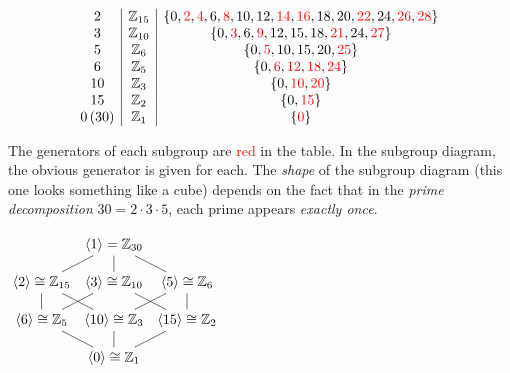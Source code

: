\begin{example}{}{}
\[\begin{array}[t]{c|c|c}
			2 & \mathbb{Z}_{15} & \{0,\textcolor{red}{2},\textcolor{red}{4},6,\textcolor{red}{8},10,12,\textcolor{red}{14},\textcolor{red}{16},18,20,\textcolor{red}{22},24,\textcolor{red}{26},\textcolor{red}{28}\}\\
			3 & \mathbb{Z}_{10} & \{0,\textcolor{red}{3},6,\textcolor{red}{9},12,15,18,\textcolor{red}{21},24,\textcolor{red}{27}\}\\
			5 & \mathbb{Z}_6 & \{0,\textcolor{red}{5},10,15,20,\textcolor{red}{25}\}\\
			6 & \mathbb{Z}_5 & \{0,\textcolor{red}{6},\textcolor{red}{12},\textcolor{red}{18},\textcolor{red}{24}\}\\
			10 & \mathbb{Z}_3 & \{0,\textcolor{red}{10},\textcolor{red}{20}\}\\
			15 & \mathbb{Z}_2 & \{0,\textcolor{red}{15}\}\\
			0\,(30) & \mathbb{Z}_1 & \{\textcolor{red}{0}\}
   \end{array}
  \]
    
	\begin{minipage}[t]{0.62\linewidth}\vspace{0pt}
		The generators of each subgroup are \textcolor{red}{red} in the table. In the subgroup diagram, the obvious generator is given for each.\smallbreak
		The \emph{shape} of the subgroup diagram (this one looks something like a cube) depends on the fact that in the \emph{prime decomposition} $30=2\cdot 3\cdot 5$, each prime appears \emph{exactly once}.
	\end{minipage}
	\hfill
	\begin{minipage}[t]{0.36\linewidth}\vspace{-5pt}
		\flushright%
		$\xymatrix @C4pt @R11pt{%
		 	& \ip{1}=\Z_{30} \ar@{-}[dl] \ar@{-}[d] \ar@{-}[dr] & \\
			\ip{2}\cong \Z_{15} \ar@{-}[d] \ar@{-}[dr] & \ip{3}\cong\Z_{10} \ar@{-}[dl] \ar@{-}[dr] & \ip{5}\cong\Z_6 \ar@{-}[d] \ar@{-}[dl] \\
			\ip{6}\cong\Z_5 \ar@{-}[dr] & \ip{10}\cong \Z_{3} \ar@{-}[d] & \ip{15}\cong\Z_2 \ar@{-}[dl] \\
 & \ip{0}\cong\Z_1 &}$
	\end{minipage}
 
\end{example}

\goodbreak

